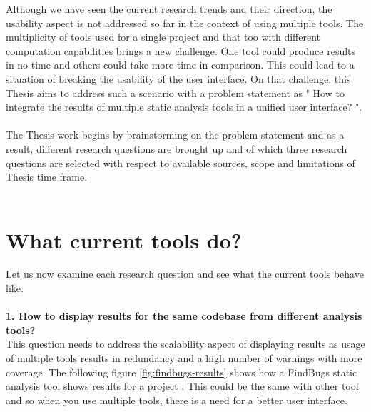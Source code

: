 Although we have seen the current research trends and their direction, the usability aspect is not addressed so far in the context of using multiple tools. The multiplicity of tools used for a single project and that too with different computation capabilities brings a new challenge.  One tool could produce results in no time and others could take more time in comparison. This could lead to a situation of breaking the usability of the user interface. On that challenge, this Thesis aims to address such a scenario with a problem statement as " How to integrate the results of multiple static analysis tools in a unified user interface? ".  \\ \\

The Thesis work begins by brainstorming on the problem statement and as a result, different research questions are brought up and of which three research questions are selected with respect to available sources, scope and limitations of Thesis time frame. \\ \\

\section{What current tools do?}

Let us now examine each research question and see what the current tools behave like. \\ \\

\textbf{1. How to display results for the same codebase from different analysis tools?}  \\

This question needs to address the scalability aspect of displaying results as usage of multiple tools results in redundancy and a high number of warnings with more coverage. The following figure \ref{fig:findbugs-results} shows how a FindBugs \cite{findbugs} static analysis tool shows results for a project \cite{findbugs-example}. This could be the same with other tool and so when you use multiple tools, there is a need for a better user interface.\\ \\

